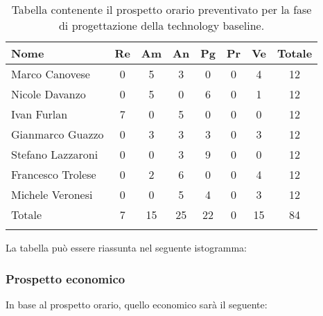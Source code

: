 			\begin{longtable}{|l|c|c|c|c|c|c|c|}
				\hline
				\rowcolor{lighter-grayer}
				\textbf{Nome} & \textbf{Re} & \textbf{Am} & \textbf{An} & \textbf{Pg}  & \textbf{Pr}   & \textbf{Ve} & \textbf{Totale} \\
				\hline
				\endfirsthead
				
				\hline
				Marco Canovese & 0 & 5 & 3 & 0 & 0 & 4 & 12\\
				\hline
				\hline
				Nicole Davanzo & 0 & 5 & 0 & 6 & 0 & 1 & 12\\
				\hline
				\hline
				Ivan Furlan & 7 & 0 & 5 & 0 & 0 & 0 & 12\\
				\hline
				\hline
				Gianmarco Guazzo & 0 & 3 & 3 & 3 & 0 & 3 & 12\\
				\hline
				\hline
				Stefano Lazzaroni & 0 & 0 & 3 & 9 & 0 & 0 & 12\\
				\hline
				\hline
				Francesco Trolese & 0 & 2 & 6 & 0 & 0 & 4 & 12\\
				\hline
				\hline
				Michele Veronesi & 0 & 0 & 5 & 4 & 0 & 3 & 12\\
				\hline 
				\hline
				Totale & 7 & 15 & 25 & 22 & 0 & 15 & 84\\
				\hline 
				\caption{Tabella contenente il prospetto orario preventivato per la fase di progettazione della technology baseline.}
			\end{longtable}

		
			La tabella può essere riassunta nel seguente istogramma:
		
		
			\subsubsection{Prospetto economico}
			In base al prospetto orario, quello economico sarà il seguente: 
			
